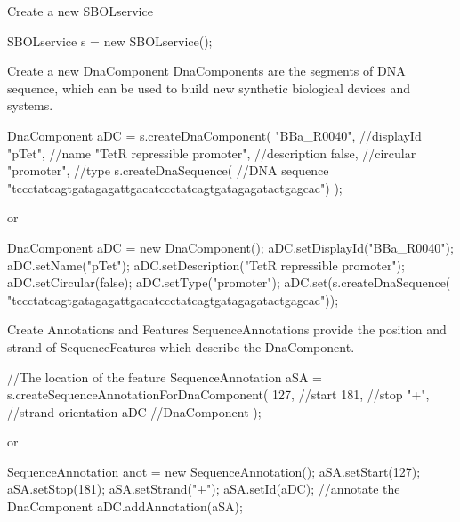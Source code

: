 \begin{DoxyEnumerate}
\item \begin{DoxyParagraph}{Create a new SBOLservice}

\begin{DoxyCode}
SBOLservice s = new SBOLservice();
\end{DoxyCode}

\end{DoxyParagraph}

\item \begin{DoxyParagraph}{Create a new DnaComponent}
DnaComponents are the segments of DNA sequence, which can be used to build new synthetic biological devices and systems. 
\begin{DoxyCode}
DnaComponent aDC = s.createDnaComponent(
                "BBa_R0040",                 //displayId
                "pTet",                      //name
                "TetR repressible promoter", //description
                false,                       //circular
                "promoter",                  //type
                s.createDnaSequence(         //DNA sequence
                     "tccctatcagtgatagagattgacatccctatcagtgatagagatactgagcac")
                );
\end{DoxyCode}
 or 
\begin{DoxyCode}
DnaComponent aDC = new DnaComponent();
aDC.setDisplayId("BBa_R0040");
aDC.setName("pTet");
aDC.setDescription("TetR repressible promoter");
aDC.setCircular(false);
aDC.setType("promoter");
aDC.set(s.createDnaSequence(
                  "tccctatcagtgatagagattgacatccctatcagtgatagagatactgagcac"));
\end{DoxyCode}

\end{DoxyParagraph}

\item \begin{DoxyParagraph}{Create Annotations and Features}
SequenceAnnotations provide the position and strand of SequenceFeatures which describe the DnaComponent. 
\begin{DoxyCode}
//The location of the feature
SequenceAnnotation aSA = s.createSequenceAnnotationForDnaComponent(
                    127, //start
                    181, //stop
                    "+", //strand orientation
                    aDC  //DnaComponent
                    );
\end{DoxyCode}
 or 
\begin{DoxyCode}
SequenceAnnotation anot = new SequenceAnnotation();
aSA.setStart(127);
aSA.setStop(181);
aSA.setStrand("+");
aSA.setId(aDC);
//annotate the DnaComponent
aDC.addAnnotation(aSA);
\end{DoxyCode}


\end{DoxyParagraph}
\end{DoxyEnumerate}
